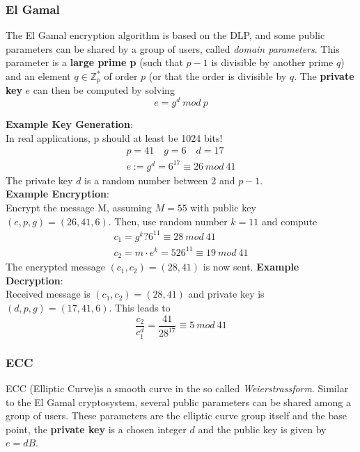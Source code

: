\documentclass[a4paper, 10 pt, conference]{ieeeconf}
\begin{document}
\vspace{0.5cm}
\subsubsection{\textbf{El Gamal}}

The El Gamal encryption algorithm is based on the DLP, and some public parameters can be shared by a group of users, called \emph{domain parameters}. This parameter is a \textbf{large prime p} (such that $p-1$ is divisible by another prime $q$) and an element $q \in \mathbb{Z}^{*}_{p}$ of order $p$ (or that the order is divisible by $q$. The \textbf{private key} $e$ can then be computed by solving
\begin{equation*}
e = g^{d} \ mod \ p
\end{equation*}

\textbf{Example Key Generation}: \\
In real applications, p should at least be 1024 bits!
\begin{align*}
p = 41 \quad g = 6 \quad d = 17 \\
e := g^{d} = 6^{17} \equiv 26 \ mod \ 41
\end{align*}
The private key $d$ is a random number between 2 and $p-1$. \\
\textbf{Example Encryption}: \\
Encrypt the message M, assuming $M=55$ with public key $(e,p,g) = (26,41,6)$. Then, use random number $k=11$ and compute 
\begin{align*}
c_1 = g^{k} ? 6^{11} \equiv 28 \ mod \ 41 \\
c_2 = m\cdot e^{k} = 526^{11} \equiv 19 \ mod \ 41
\end{align*}
The encrypted message $(c_1,c_2) = (28,41)$ is now sent. 
\textbf{Example Decryption}: \\
Received message is $(c_1,c_2) = (28,41)$ and private key is $(d,p,g) = (17,41,6)$. This leads to 
\begin{equation*}
\frac{c_2}{c_1^{d}} = \frac{41}{28^{17}} \equiv 5 \ mod \ 41
\end{equation*}

\subsubsection{\textbf{ECC}}
ECC (Elliptic Curve)is a smooth curve in the so called \emph{Weierstrassform}. 
Similar to the El Gamal cryptosystem, several public parameters can be shared among a group of users.
These parameters are the elliptic curve group itself and the base point, the \textbf{private key} is a chosen integer $d$ and the public key is given by $e=dB$. 
\end{document}
